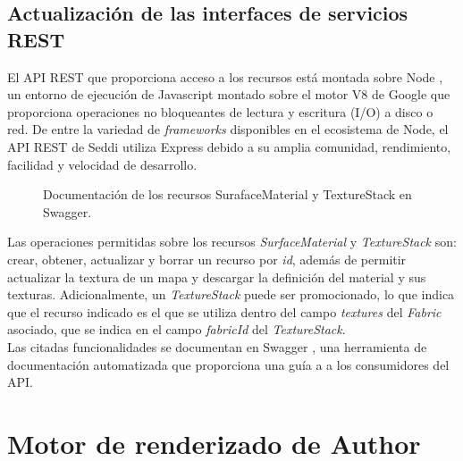 \subsection{Actualizaci\'on de las interfaces de servicios REST}
El API REST que proporciona acceso a los recursos est\'a montada sobre Node \autocite{node}, un entorno de ejecuci\'on de Javascript montado
sobre el motor V8 de Google que proporciona operaciones no bloqueantes de lectura y escritura (I/O) a disco o red.
De entre la variedad de \textit{frameworks} disponibles en el ecosistema de Node, el API REST de Seddi utiliza Express debido
a su amplia comunidad, rendimiento, facilidad y velocidad de desarrollo.\\

\begin{figure}[H]
  \vspace{0.5cm}
  \centering
  \caption{Documentaci\'on de los recursos SurafaceMaterial y TextureStack en Swagger.}
  \vspace{0.5cm}
\end{figure}

Las operaciones permitidas sobre los recursos \textit{SurfaceMaterial} y \textit{TextureStack} son: crear, obtener, actualizar y borrar
un recurso por \textit{id}, adem\'as de permitir actualizar la textura de un mapa y descargar la definici\'on del material
y sus texturas. Adicionalmente, un \textit{TextureStack} puede ser promocionado, lo que indica que el recurso indicado
es el que se utiliza dentro del campo \textit{textures} del \textit{Fabric} asociado, que se indica en el campo \textit{fabricId} del
\textit{TextureStack}.\\
\newpage
Las citadas funcionalidades se documentan en Swagger \autocite{swagger}, una herramienta de documentaci\'on automatizada que proporciona una gu\'ia a
a los consumidores del API.







\section{Motor de renderizado de Author}

